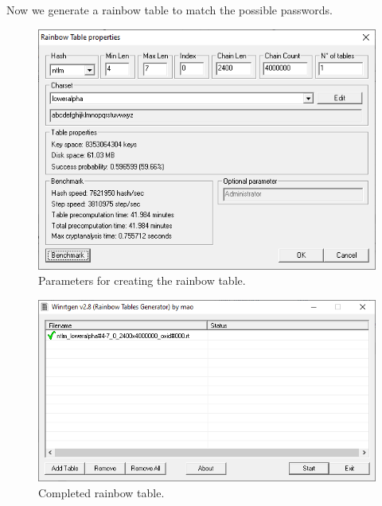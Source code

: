 Now we generate a rainbow table to match the possible passwords.
\begin{figure}[H]
    \centering
    \includegraphics[width=\linewidth]{figures/3-create-rainbow-table.png}
    \caption{Parameters for creating the rainbow table.}
\end{figure}
\begin{figure}[H]
    \centering
    \includegraphics[width=\linewidth]{figures/4-rainbow-table-complete.png}
    \caption{Completed rainbow table.}
\end{figure}

